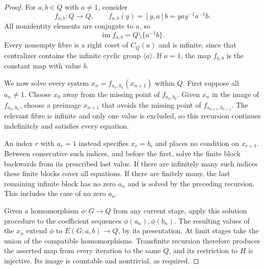 \begin{proof}
For $a,b\in Q$ with $a\ne1$, consider
\[
 f_{a,b}:Q\longrightarrow Q,\qquad
 f_{a,b}(y)=[y,a]b= y a y^{-1}a^{-1}b.
\]
All nonidentity elements are conjugate to $a$, so
\[
 \operatorname{im} f_{a,b}=Q\setminus\{a^{-1}b\}.
\]
Every nonempty fibre is a right coset of $C_Q(a)$ and is infinite,
since that centralizer contains the infinite cyclic group $\langle
 a\rangle$. If $a=1$, the map $f_{a,b}$ is the constant map with
value $b$.

We now solve every system $x_n=f_{a_n,b_n}(x_{n+1})$ within $Q$.
First suppose all $a_n\ne1$. Choose $x_0$ away from the missing
point of $f_{a_0,b_0}$. Given $x_n$ in the image of $f_{a_n,b_n}$,
choose a preimage $x_{n+1}$ that avoids the missing point of
$f_{a_{n+1},b_{n+1}}$. The relevant fibre is infinite and only one
value is excluded, so this recursion continues indefinitely and
satisfies every equation.

An index $r$ with $a_r=1$ instead specifies $x_r=b_r$ and places no
condition on $x_{r+1}$. Between consecutive such indices, and before
the first, solve the finite block backwards from its prescribed
last value. If there are infinitely many such indices these finite
blocks cover all equations. If there are finitely many, the last
remaining infinite block has no zero $a_n$ and is solved by the
preceding recursion. This includes the case of no zero $a_n$.

Given a homomorphism $\phi:G\to Q$ from any current stage, apply
this solution procedure to the coefficient sequences
$\phi(a_n),\phi(b_n)$. The resulting values of the $x_n$ extend
$\phi$ to $E(G;a,b)\to Q$, by its presentation. At limit stages take
the union of the compatible homomorphisms. Transfinite recursion
therefore produces the asserted map from every iteration to the
same $Q$, and its restriction to $H$ is injective. Its image is
countable and nontrivial, as required.
\end{proof}
